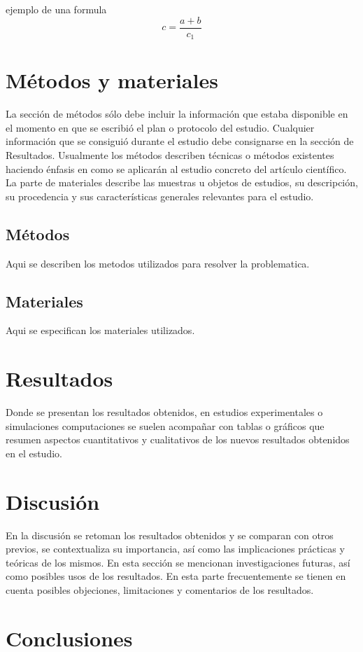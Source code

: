 \documentclass[10pt,letterpaper]{article}
\begin{document}
\begin{multicols}{2}
    ejemplo de una formula
    \[c=\frac{a+b}{c_1}\]


\section{Métodos y materiales}
La sección de métodos sólo debe incluir la información que estaba disponible en el momento en que se escribió el plan o protocolo del estudio. Cualquier información que se consiguió durante el estudio debe consignarse en la sección de Resultados. Usualmente los métodos describen técnicas o métodos existentes haciendo énfasis en como se aplicarán al estudio concreto del artículo científico. La parte de materiales describe las muestras u objetos de estudios, su descripción, su procedencia y sus características generales relevantes para el estudio.
\subsection{Métodos}
Aqui se describen los metodos utilizados para resolver la problematica.

\subsection{Materiales}
Aqui se especifican los materiales utilizados.

\section{Resultados}
Donde se presentan los resultados obtenidos, en estudios experimentales o simulaciones computaciones se suelen acompañar con tablas o gráficos que resumen aspectos cuantitativos y cualitativos de los nuevos resultados obtenidos en el estudio.

\section{Discusión}
En la discusión se retoman los resultados obtenidos y se comparan con otros previos, se contextualiza su importancia, así como las implicaciones prácticas y teóricas de los mismos. En esta sección se mencionan investigaciones futuras, así como posibles usos de los resultados. En esta parte frecuentemente se tienen en cuenta posibles objeciones, limitaciones y comentarios de los resultados.

\section{Conclusiones}


\end{multicols}
\end{document}
